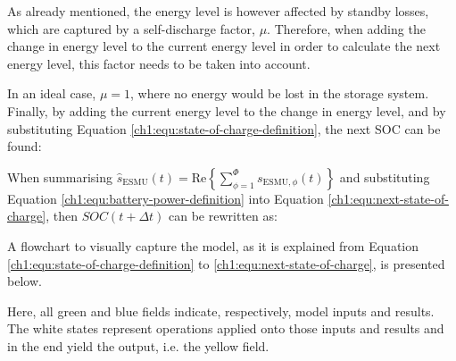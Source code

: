 

\nomenclature{$\mu$}{Self-discharge losses of battery, where $\mu \in (0, 1]$ (Chapter \ref{ch1})}

As already mentioned, the energy level is however affected by standby losses, which are captured by a self-discharge factor, $\mu$.
Therefore, when adding the change in energy level to the current energy level in order to calculate the next energy level, this factor needs to be taken into account.



In an ideal case, $\mu = 1$, where no energy would be lost in the storage system.
Finally, by adding the current energy level to the change in energy level, and by substituting Equation \ref{ch1:equ:state-of-charge-definition}, the next SOC can be found:



When summarising $\hat{s}_\text{ESMU}(t) = \text{Re}\left\{\sum_{\phi=1}^{\Phi}s_{\text{ESMU},\phi}(t)\right\}$ and substituting Equation \ref{ch1:equ:battery-power-definition} into Equation \ref{ch1:equ:next-state-of-charge}, then $SOC(t+\Delta t)$ can be rewritten as:



A flowchart to visually capture the model, as it is explained from Equation \ref{ch1:equ:state-of-charge-definition} to \ref{ch1:equ:next-state-of-charge}, is presented below.



Here, all green and blue fields indicate, respectively, model inputs and results.
The white states represent operations applied onto those inputs and results and in the end yield the output, i.e. the yellow field.
